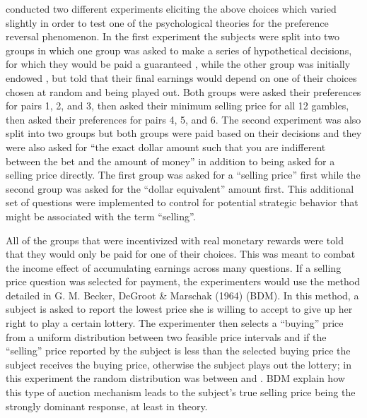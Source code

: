 \documentclass[../main.tex]{subfiles}
\begin{document}
\textcite{Grether1979} conducted two different experiments eliciting the above choices which  varied slightly in order to test one of the psychological theories for the preference reversal phenomenon.
In the first experiment the subjects were split into two groups in which one group was asked to make a series of hypothetical decisions, for which they would be paid a guaranteed , while the other group was initially endowed , but told that their final earnings would depend on one of their choices chosen at random and being played out.
Both groups were asked their preferences for pairs 1, 2, and 3, then asked their minimum selling price for all 12 gambles, then asked their preferences for pairs 4, 5, and 6.
The second experiment was also split into two groups but both groups were paid based on their decisions and they were also asked for \enquote{the exact dollar amount such that you are indifferent between the bet and the amount of money} in addition to being asked for a selling price directly.
The first group was asked for a \enquote{selling price} first while the second group was asked for the \enquote{dollar equivalent} amount first.
This additional set of questions were implemented to control for potential strategic behavior that might be associated with the term \enquote{selling}.

All of the groups that were incentivized with real monetary rewards were told that they would only be paid for one of their choices.
This was meant to combat the income effect of accumulating earnings across many questions.
If a selling price question was selected for payment, the experimenters would use the method detailed in G. M. Becker, DeGroot \& Marschak (1964) (BDM).
In this method, a subject is asked to report the lowest price she is willing to accept to give up her right to play a certain lottery.
The experimenter then selects a \enquote{buying} price from a uniform distribution between two feasible price intervals and if the \enquote{selling} price reported by the subject is less than the selected buying price the subject receives the buying price, otherwise the subject plays out the lottery; in this experiment the random distribution was between  and .
BDM explain how this type of auction mechanism leads to the subject's true selling price being the strongly dominant response, at least in theory.
\end{document}
